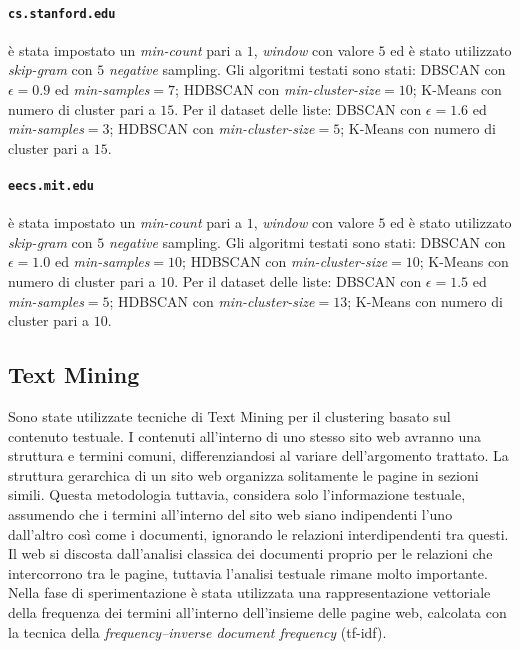 \paragraph{\texttt{cs.stanford.edu}} è stata impostato un \textit{min-count} pari a $1$, \textit{window} con valore $5$ ed è stato utilizzato \textit{skip-gram} con $5$ \textit{negative} sampling. Gli algoritmi testati sono stati: DBSCAN con $\epsilon = 0.9$ ed \textit{min-samples}$ = 7$; HDBSCAN con \textit{min-cluster-size}$=10$; K-Means con numero di cluster pari a $15$. Per il dataset delle liste: DBSCAN con $\epsilon = 1.6$ ed \textit{min-samples}$ = 3$; HDBSCAN con \textit{min-cluster-size}$=5$; K-Means con numero di cluster pari a $15$.

\paragraph{\texttt{eecs.mit.edu}} è stata impostato un \textit{min-count} pari a $1$, \textit{window} con valore $5$ ed è stato utilizzato \textit{skip-gram} con $5$ \textit{negative} sampling. Gli algoritmi testati sono stati: DBSCAN con $\epsilon = 1.0$ ed \textit{min-samples}$ = 10$; HDBSCAN con \textit{min-cluster-size}$=10$; K-Means con numero di cluster pari a $10$. Per il dataset delle liste: DBSCAN con $\epsilon = 1.5$ ed \textit{min-samples}$ = 5$; HDBSCAN con \textit{min-cluster-size}$=13$; K-Means con numero di cluster pari a $10$.


\subsection{Text Mining}
Sono state utilizzate tecniche di Text Mining per il clustering basato sul contenuto testuale. I contenuti all'interno di uno stesso sito web avranno una struttura e termini comuni, differenziandosi al variare dell'argomento trattato. La struttura gerarchica di un sito web organizza solitamente le pagine in sezioni simili. Questa metodologia tuttavia, considera solo l'informazione testuale, assumendo che i termini all'interno del sito web siano indipendenti l'uno dall'altro così come i documenti, ignorando le relazioni interdipendenti tra questi. Il web si discosta dall'analisi classica dei documenti proprio per le relazioni che intercorrono tra le pagine, tuttavia l'analisi testuale rimane molto importante.
\\
Nella fase di sperimentazione è stata utilizzata una rappresentazione vettoriale della frequenza dei termini all'interno dell'insieme delle pagine web, calcolata con la tecnica della \textit{frequency–inverse document frequency} (tf-idf).

